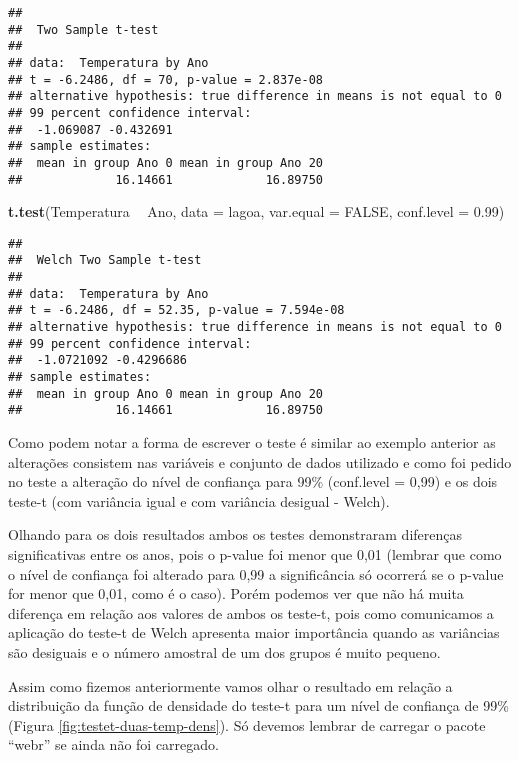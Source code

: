 \documentclass[titlepage, oneside, openany, a4paper]{book}
\newenvironment{Shaded}{\begin{snugshade}}{\end{snugshade}}
\newcommand{\DataTypeTok}[1]{\textcolor[rgb]{0.13,0.29,0.53}{#1}}
\newcommand{\FloatTok}[1]{\textcolor[rgb]{0.00,0.00,0.81}{#1}}
\newcommand{\KeywordTok}[1]{\textcolor[rgb]{0.13,0.29,0.53}{\textbf{#1}}}
\newcommand{\NormalTok}[1]{#1}
\newcommand{\OperatorTok}[1]{\textcolor[rgb]{0.81,0.36,0.00}{\textbf{#1}}}
\newcommand{\OtherTok}[1]{\textcolor[rgb]{0.56,0.35,0.01}{#1}}
\newcommand{\StringTok}[1]{\textcolor[rgb]{0.31,0.60,0.02}{#1}}
\begin{document}
\begin{verbatim}
## 
##  Two Sample t-test
## 
## data:  Temperatura by Ano
## t = -6.2486, df = 70, p-value = 2.837e-08
## alternative hypothesis: true difference in means is not equal to 0
## 99 percent confidence interval:
##  -1.069087 -0.432691
## sample estimates:
##  mean in group Ano 0 mean in group Ano 20 
##             16.14661             16.89750
\end{verbatim}

\begin{Shaded}
\begin{Highlighting}[]
\KeywordTok{t.test}\NormalTok{(Temperatura }\OperatorTok{~}\StringTok{ }\NormalTok{Ano, }
       \DataTypeTok{data =}\NormalTok{ lagoa,}
       \DataTypeTok{var.equal =} \OtherTok{FALSE}\NormalTok{,}
       \DataTypeTok{conf.level =} \FloatTok{0.99}\NormalTok{)}
\end{Highlighting}
\end{Shaded}

\begin{verbatim}
## 
##  Welch Two Sample t-test
## 
## data:  Temperatura by Ano
## t = -6.2486, df = 52.35, p-value = 7.594e-08
## alternative hypothesis: true difference in means is not equal to 0
## 99 percent confidence interval:
##  -1.0721092 -0.4296686
## sample estimates:
##  mean in group Ano 0 mean in group Ano 20 
##             16.14661             16.89750
\end{verbatim}

Como podem notar a forma de escrever o teste é similar ao exemplo anterior as alterações consistem nas variáveis e conjunto de dados utilizado e como foi pedido no teste a alteração do nível de confiança para 99\% (conf.level = 0,99) e os dois teste-t (com variância igual e com variância desigual - Welch).

Olhando para os dois resultados ambos os testes demonstraram diferenças significativas entre os anos, pois o p-value foi menor que 0,01 (lembrar que como o nível de confiança foi alterado para 0,99 a significância só ocorrerá se o p-value for menor que 0,01, como é o caso). Porém podemos ver que não há muita diferença em relação aos valores de ambos os teste-t, pois como comunicamos a aplicação do teste-t de Welch apresenta maior importância quando as variâncias são desiguais e o número amostral de um dos grupos é muito pequeno.

Assim como fizemos anteriormente vamos olhar o resultado em relação a distribuição da função de densidade do teste-t para um nível de confiança de 99\% (Figura \ref{fig:testet-duas-temp-dens}). Só devemos lembrar de carregar o pacote ``webr'' se ainda não foi carregado.
\end{document}

